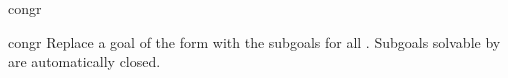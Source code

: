 \begin{tactic}{congr}
  \begin{tsyntax}[empty]{congr}
  Replace a goal of the form 
  with the subgoals  for all . Subgoals solvable
  by  are automatically closed.
  \end{tsyntax}
\end{tactic}
